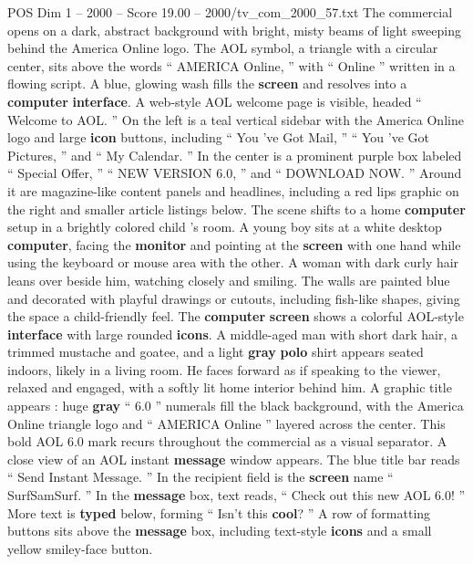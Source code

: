 \begin{textsample}{POS Dim 1 – 2000 – Score 19.00 – 2000/tv\_com\_2000\_57.txt}  \label{ex:f1_pos_031}
The commercial opens on a dark, abstract background with bright, misty beams of light sweeping behind the America Online logo.
The AOL symbol, a triangle with a circular center, sits above the words “ AMERICA Online, ” with “ Online ” written in a flowing script.
A blue, glowing wash fills the \textbf{screen} and resolves into a \textbf{computer} \textbf{interface}.
A web-style AOL welcome page is visible, headed “ Welcome to AOL. ” On the left is a teal vertical sidebar with the America Online logo and large \textbf{icon} buttons, including “ You ’ve Got Mail, ” “ You ’ve Got Pictures, ” and “ My Calendar. ” In the center is a prominent purple box labeled “ Special Offer, ” “ NEW VERSION 6.0, ” and “ DOWNLOAD NOW. ” Around it are magazine-like content panels and headlines, including a red lips graphic on the right and smaller article listings below.
The scene shifts to a home \textbf{computer} setup in a brightly colored child ’s room.
A young boy sits at a white desktop \textbf{computer}, facing the \textbf{monitor} and pointing at the \textbf{screen} with one hand while using the keyboard or mouse area with the other.
A woman with dark curly hair leans over beside him, watching closely and smiling.
The walls are painted blue and decorated with playful drawings or cutouts, including fish-like shapes, giving the space a child-friendly feel.
The \textbf{computer} \textbf{screen} shows a colorful AOL-style \textbf{interface} with large rounded \textbf{icons}.
A middle-aged man with short dark hair, a trimmed mustache and goatee, and a light \textbf{gray} \textbf{polo} shirt appears seated indoors, likely in a living room.
He faces forward as if speaking to the viewer, relaxed and engaged, with a softly lit home interior behind him.
A graphic title appears : huge \textbf{gray} “ 6.0 ” numerals fill the black background, with the America Online triangle logo and “ AMERICA Online ” layered across the center.
This bold AOL 6.0 mark recurs throughout the commercial as a visual separator.
A close view of an AOL instant \textbf{message} window appears.
The blue title bar reads “ Send Instant Message. ” In the recipient field is the \textbf{screen} name “ SurfSamSurf. ” In the \textbf{message} box, text reads, “ Check out this new AOL 6.0! ” More text is \textbf{typed} below, forming “ Isn't this \textbf{cool}? ” A row of formatting buttons sits above the \textbf{message} box, including text-style \textbf{icons} and a small yellow smiley-face button.

\end{textsample}

